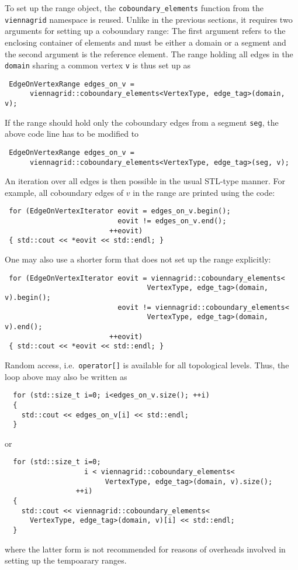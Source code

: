 To set up the range object, the \lstinline|coboundary_elements| function from the \lstinline|viennagrid| namespace is reused. Unlike in the previous sections, it requires two arguments
for setting up a coboundary range: The first argument refers to the enclosing container of elements and must be either a domain or a segment and the second argument is the reference element.
The range holding all edges in the \lstinline|domain| sharing a common vertex \lstinline|v| is thus set up as
\begin{lstlisting}
 EdgeOnVertexRange edges_on_v =
      viennagrid::coboundary_elements<VertexType, edge_tag>(domain, v);
\end{lstlisting}

\pagebreak

If the range should hold only the coboundary edges from a segment \lstinline|seg|, the above code line has to be modified to
\begin{lstlisting}
 EdgeOnVertexRange edges_on_v =
      viennagrid::coboundary_elements<VertexType, edge_tag>(seg, v);
\end{lstlisting}

An iteration over all edges is then possible in the usual STL-type manner. For example, all coboundary edges of $v$ in the range are printed using the code:
\begin{lstlisting}
 for (EdgeOnVertexIterator eovit = edges_on_v.begin();
                           eovit != edges_on_v.end();
                         ++eovit)
 { std::cout << *eovit << std::endl; }
\end{lstlisting}
One may also use a shorter form that does not set up the range explicitly:
\begin{lstlisting}
 for (EdgeOnVertexIterator eovit = viennagrid::coboundary_elements<
                                  VertexType, edge_tag>(domain, v).begin();
                           eovit != viennagrid::coboundary_elements<
                                  VertexType, edge_tag>(domain, v).end();
                         ++eovit)
 { std::cout << *eovit << std::endl; }
\end{lstlisting}

Random access, i.e.~\lstinline|operator[]| is available for all topological levels. Thus, the loop above may also be written as
\begin{lstlisting}
  for (std::size_t i=0; i<edges_on_v.size(); ++i)
  {
    std::cout << edges_on_v[i] << std::endl;
  }
\end{lstlisting}
or 
\begin{lstlisting}
  for (std::size_t i=0;
                   i < viennagrid::coboundary_elements<
                        VertexType, edge_tag>(domain, v).size();
                 ++i)
  {
    std::cout << viennagrid::coboundary_elements<
      VertexType, edge_tag>(domain, v)[i] << std::endl;
  }
\end{lstlisting}
where the latter form is not recommended for reasons of overheads involved in setting up the tempoarary ranges.

